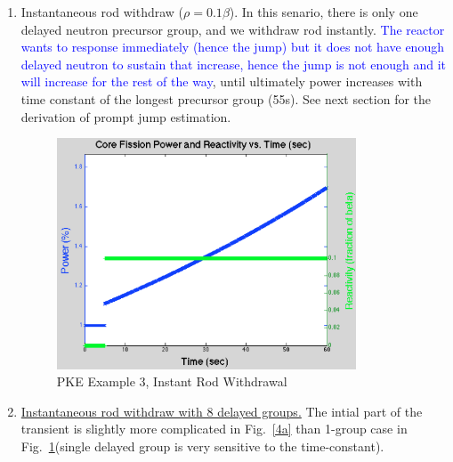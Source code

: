 \documentclass{school-22.211-notes}
\begin{document}
\begin{enumerate}
\clearpage
\item Instantaneous rod withdraw ($\rho = 0.1 \beta$). In this senario, there is only one delayed neutron precursor group, and we withdraw rod instantly. \textcolor{blue}{The reactor wants to response immediately (hence the jump) but it does not have enough delayed neutron to sustain that increase, hence the jump is not enough and it will increase for the rest of the way}, until ultimately power increases with time constant of the longest precursor group (55s). See next section for the derivation of prompt jump estimation. 
  \begin{figure}[ht]
    \centering
    \includegraphics[width=3.5in]{images/pke/ex3.png}
    \caption{PKE Example 3, Instant Rod Withdrawal}  \label{ex3}
  \end{figure}
 


\item \uline{Instantaneous rod withdraw with 8 delayed groups.} The intial part of the transient is slightly more complicated in Fig.~\ref{4a} than 1-group case in Fig.~\ref{ex3}(single delayed group is very sensitive to the time-constant). 


\end{enumerate}
\end{document}
